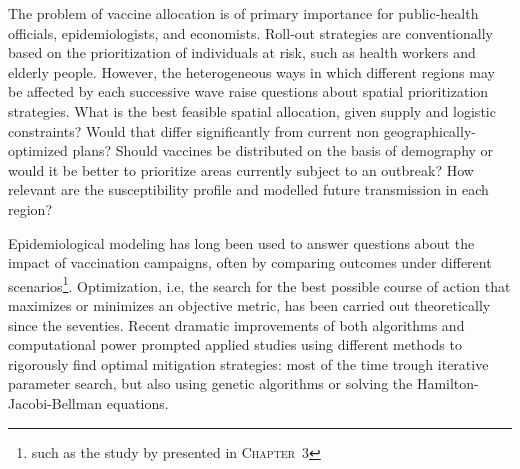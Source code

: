 The problem of vaccine allocation is of primary importance for  public-health officials, epidemiologists, and economists\cite[-7.5\baselineskip]{Emanuel:EthicalFrameworkGlobal:2020, Lipsitch:UnderstandingCOVID19Vaccine:2020}. 
Roll-out strategies are conventionally based on the prioritization of individuals at risk, such as health workers and elderly people\cite[-6.5\baselineskip]{Bubar:ModelinformedCOVID19Vaccine:2021,Fitzpatrick:OptimizingAgespecificVaccination:2021,Baden:EfficacySafetyMRNA1273:2020,Yang:WhoShouldBe:2021}. However, the heterogeneous ways in which different regions may be affected by each successive wave raise questions about spatial prioritization strategies. What is the best feasible spatial allocation, given supply and logistic constraints? Would that differ significantly from current non geographically-optimized plans? Should vaccines be distributed on the basis of demography or would it be better to prioritize areas currently subject to an outbreak? How relevant are the susceptibility profile and modelled future transmission in each region? 

Epidemiological modeling has long been used to answer questions about the impact of vaccination campaigns, often by comparing outcomes under different scenarios\footnote[][-9.3\baselineskip]{such as the study by \textcite{Lee:AchievingCoordinatedNational:2020} presented in \textsc{Chapter~3}}. Optimization, i.e, the search for the best possible course of action that maximizes or minimizes an objective metric, has been carried out theoretically since the seventies. Recent dramatic improvements of both algorithms\cite[-8.5\baselineskip]{Quirynen:MultipleShootingMicrosecond:2015} and computational power prompted applied studies using different methods to rigorously find optimal mitigation strategies: most of the time trough iterative parameter search, but also using genetic algorithms or solving the Hamilton-Jacobi-Bellman equations.

